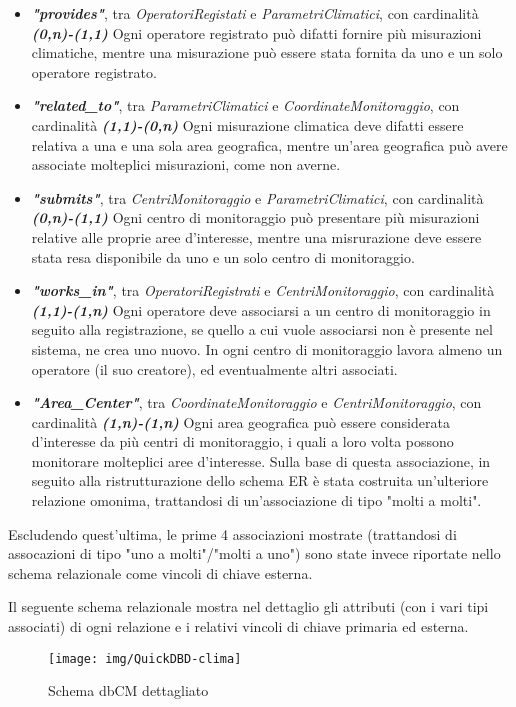 \begin{itemize}
	\item \textbf{\textit{"provides"}}, tra \textit{OperatoriRegistati} e \textit{ParametriClimatici}, con cardinalità \textbf{\textit{(0,n)-(1,1)}}
	      Ogni operatore registrato può difatti fornire più misurazioni climatiche, mentre una misurazione può essere stata fornita da uno e un solo operatore registrato.
	\item \textbf{\textit{"related\_to"}}, tra \textit{ParametriClimatici} e \textit{CoordinateMonitoraggio}, con cardinalità \textbf{\textit{(1,1)-(0,n)}}
	      Ogni misurazione climatica deve difatti essere relativa a una e una sola area geografica, mentre un'area geografica può avere associate molteplici misurazioni, come non averne.
	\item \textbf{\textit{"submits"}}, tra \textit{CentriMonitoraggio} e \textit{ParametriClimatici}, con cardinalità \textbf{\textit{(0,n)-(1,1)}}
	      Ogni centro di monitoraggio può presentare più misurazioni relative alle proprie aree d'interesse, mentre una misrurazione deve essere stata resa disponibile da uno e un solo centro di monitoraggio.
	\item \textbf{\textit{"works\_in"}}, tra \textit{OperatoriRegistrati} e \textit{CentriMonitoraggio}, con cardinalità \textbf{\textit{(1,1)-(1,n)}}
	      Ogni operatore deve associarsi a un centro di monitoraggio in seguito alla registrazione, se quello a cui vuole associarsi non è presente nel sistema, ne crea uno nuovo. In ogni centro di monitoraggio lavora almeno un operatore (il suo creatore), ed eventualmente altri associati.
	\item \textbf{\textit{"Area\_Center"}}, tra \textit{CoordinateMonitoraggio} e \textit{CentriMonitoraggio}, con cardinalità \textbf{\textit{(1,n)-(1,n)}}
	      Ogni area geografica può essere considerata d'interesse da più centri di monitoraggio, i quali a loro volta possono monitorare molteplici aree d'interesse.
	      Sulla base di questa associazione, in seguito alla ristrutturazione dello schema ER è stata costruita un'ulteriore relazione omonima, trattandosi di un'associazione di tipo "molti a molti".
\end{itemize}
Escludendo quest'ultima, le prime 4 associazioni mostrate (trattandosi di assocazioni di tipo "uno a molti"/"molti a uno") sono state invece riportate nello schema relazionale come vincoli di chiave esterna.
\pagebreak

Il seguente schema relazionale mostra nel dettaglio gli attributi (con i vari tipi associati) di ogni relazione e i relativi vincoli di chiave primaria ed esterna.
\begin{figure}[h]
	\centering
	\texttt{[image: img/QuickDBD-clima]}
	\caption{Schema dbCM dettagliato}
	\label{fig:quickdbd-clima}
\end{figure}

